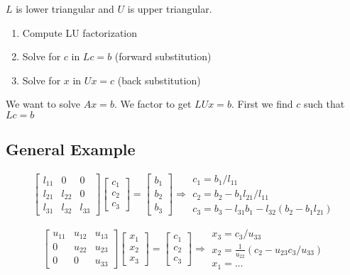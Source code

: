 $L$ is lower triangular and $U$ is upper triangular.

\begin{enumerate}
	\item Compute LU factorization
	\item Solve for $c$ in $Lc = b$ (forward substitution)
	\item Solve for $x$ in $Ux = c$ (back substitution)
\end{enumerate}

We want to solve $Ax=b$. We factor to get $LUx =b$. First we find $c$ such that $Lc = b$

\subsection{General Example}
\[
	\begin{bmatrix}
		l_{11} & 0 & 0 \\
		l_{21} & l_{22} & 0 \\
		l_{31} & l_{32} & l_{33}
	\end{bmatrix}
	\begin{bmatrix}
		c_1 \\ c_2 \\ c_3
	\end{bmatrix} = 
	\begin{bmatrix}
		b_1 \\ b_2 \\ b_3
	\end{bmatrix} \Rightarrow
	\begin{matrix}
		c_1 = b_1 / l_{11} \\
		c_2 = b_2 - b_1 l_{21}/ l_{11} \\
		c_3 = b_3 - l_{31}b_1 - l_{32}(b_2 - b_1 l_{21})
	\end{matrix}
\]

\[
	\begin{bmatrix}
		u_{11} & u_{12} & u_{13} \\
		0 & u_{22} & u_{23} \\
		0 & 0 & u_{33}
	\end{bmatrix}
	\begin{bmatrix}
		x_1 \\ x_2 \\ x_3
	\end{bmatrix} = 
	\begin{bmatrix}
		c_1 \\ c_2 \\ c_3
	\end{bmatrix} \Rightarrow
	\begin{matrix}
		x_3 = c_3/u_{33} \\
		x_2 = \frac{1}{u_{22}}(c_2 - u_{23}c_3/u_{33})\\
		x_1 = \dots
	\end{matrix}
\]